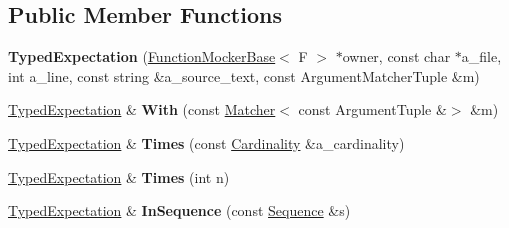 \subsection*{Public Member Functions}
\begin{DoxyCompactItemize}
\item 
\mbox{\label{classtesting_1_1internal_1_1_typed_expectation_a10bd0a8fa0db37215be42e1c61ccbc28}} 
{\bfseries Typed\+Expectation} (\mbox{\hyperlink{classtesting_1_1internal_1_1_function_mocker_base}{Function\+Mocker\+Base}}$<$ F $>$ $\ast$owner, const char $\ast$a\+\_\+file, int a\+\_\+line, const string \&a\+\_\+source\+\_\+text, const Argument\+Matcher\+Tuple \&m)
\item 
\mbox{\label{classtesting_1_1internal_1_1_typed_expectation_aa69c4f9b1f2cce49609023d7e5f65297}} 
\mbox{\hyperlink{classtesting_1_1internal_1_1_typed_expectation}{Typed\+Expectation}} \& {\bfseries With} (const \mbox{\hyperlink{classtesting_1_1_matcher}{Matcher}}$<$ const Argument\+Tuple \&$>$ \&m)
\item 
\mbox{\label{classtesting_1_1internal_1_1_typed_expectation_a9a4c34ee5c6e6adc880a22f61f33da57}} 
\mbox{\hyperlink{classtesting_1_1internal_1_1_typed_expectation}{Typed\+Expectation}} \& {\bfseries Times} (const \mbox{\hyperlink{classtesting_1_1_cardinality}{Cardinality}} \&a\+\_\+cardinality)
\item 
\mbox{\label{classtesting_1_1internal_1_1_typed_expectation_a92d56ee785d38ec8193aed2a0fcbccf0}} 
\mbox{\hyperlink{classtesting_1_1internal_1_1_typed_expectation}{Typed\+Expectation}} \& {\bfseries Times} (int n)
\item 
\mbox{\label{classtesting_1_1internal_1_1_typed_expectation_ada9e9081a98435991310ac60483d1230}} 
\mbox{\hyperlink{classtesting_1_1internal_1_1_typed_expectation}{Typed\+Expectation}} \& {\bfseries In\+Sequence} (const \mbox{\hyperlink{classtesting_1_1_sequence}{Sequence}} \&s)
\item 
\mbox{\label{classtesting_1_1internal_1_1_typed_expectation_ac0f45c73e3f816796f6c5dea2dc70131}} 

\end{DoxyCompactItemize}
